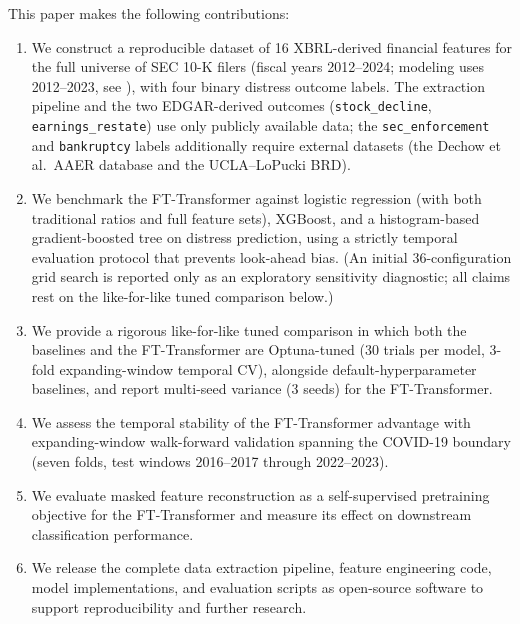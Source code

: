 This paper makes the following contributions:
\begin{enumerate}[leftmargin=*]
  \item We construct a reproducible dataset of 16 XBRL-derived financial features for the full universe of SEC 10-K filers (fiscal years 2012--2024; modeling uses 2012--2023, see ), with four binary distress outcome labels. The extraction pipeline and the two EDGAR-derived outcomes (\texttt{stock\_decline}, \texttt{earnings\_restate}) use only publicly available data; the \texttt{sec\_enforcement} and \texttt{bankruptcy} labels additionally require external datasets (the Dechow et al.\ AAER database and the UCLA--LoPucki BRD).

  \item We benchmark the FT-Transformer against logistic regression (with both traditional ratios and full feature sets), XGBoost, and a histogram-based gradient-boosted tree on distress prediction, using a strictly temporal evaluation protocol that prevents look-ahead bias. (An initial 36-configuration grid search is reported only as an exploratory sensitivity diagnostic; all claims rest on the like-for-like tuned comparison below.)

  \item We provide a rigorous like-for-like tuned comparison in which both the baselines and the FT-Transformer are Optuna-tuned (30 trials per model, 3-fold expanding-window temporal CV), alongside default-hyperparameter baselines, and report multi-seed variance (3 seeds) for the FT-Transformer.

  \item We assess the temporal stability of the FT-Transformer advantage with expanding-window walk-forward validation spanning the COVID-19 boundary (seven folds, test windows 2016--2017 through 2022--2023).

  \item We evaluate masked feature reconstruction as a self-supervised pretraining objective for the FT-Transformer and measure its effect on downstream classification performance.

  \item We release the complete data extraction pipeline, feature engineering code, model implementations, and evaluation scripts as open-source software to support reproducibility and further research.
\end{enumerate}

